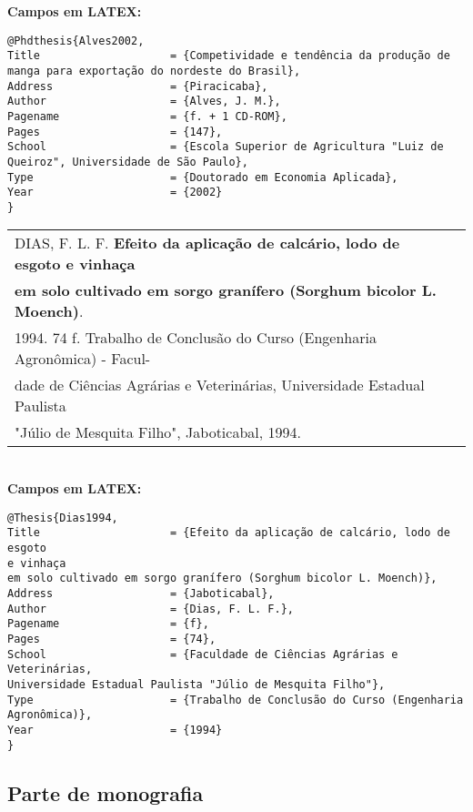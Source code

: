 \textbf{Campos em LATEX:} 
	
\begingroup
\fontsize{10pt}{12pt}\selectfont
\begin{verbatim}
@Phdthesis{Alves2002,
Title                    = {Competividade e tendência da produção de 
manga para exportação do nordeste do Brasil},
Address                  = {Piracicaba},
Author                   = {Alves, J. M.},
Pagename                 = {f. + 1 CD-ROM},
Pages                    = {147},
School                   = {Escola Superior de Agricultura "Luiz de 
Queiroz", Universidade de São Paulo},
Type                     = {Doutorado em Economia Aplicada},
Year                     = {2002}
}
\end{verbatim}
\endgroup 
	
\begin{tabular}{|l|c|} \hline
	DIAS, F. L. F. \textbf{Efeito da aplicação de calcário, lodo de esgoto e vinhaça} \\ \textbf{em solo cultivado em sorgo granífero (Sorghum bicolor L. Moench)}. \\1994. 74 f. Trabalho de Conclusão do Curso (Engenharia Agronômica) - Facul-\\dade de Ciências Agrárias e Veterinárias, Universidade Estadual Paulista \\"Júlio de Mesquita Filho", Jaboticabal, 1994.     \\\hline
\end{tabular} \\
		
\textbf{Campos em LATEX:} 
		
\begingroup
\fontsize{10pt}{12pt}\selectfont
\begin{verbatim}
@Thesis{Dias1994,
Title                    = {Efeito da aplicação de calcário, lodo de esgoto 
e vinhaça 
em solo cultivado em sorgo granífero (Sorghum bicolor L. Moench)},
Address                  = {Jaboticabal},
Author                   = {Dias, F. L. F.},
Pagename                 = {f},
Pages                    = {74},
School                   = {Faculdade de Ciências Agrárias e Veterinárias, 
Universidade Estadual Paulista "Júlio de Mesquita Filho"},
Type                     = {Trabalho de Conclusão do Curso (Engenharia 
Agronômica)},
Year                     = {1994}
}
\end{verbatim}
\endgroup
\subsection{Parte de monografia}	
	
